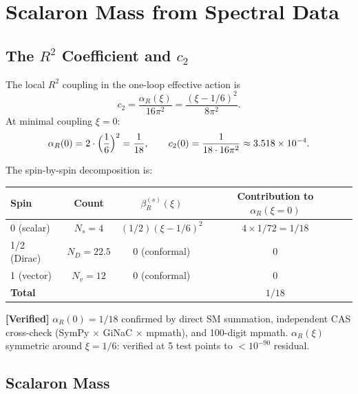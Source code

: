 \documentclass[11pt,a4paper]{article}
\theoremstyle{plain}
\theoremstyle{definition}
\newcommand{\verified}[1]{%
  \par\smallskip\noindent
  \colorbox{green!10}{\parbox{\dimexpr\linewidth-2\fboxsep}{%
    \textcolor{green!50!black}{\textbf{[Verified]}} #1}}%
  \par\smallskip}
\begin{document}
\section{Scalaron Mass from Spectral Data}\label{sec:scalaron-mass}

\subsection{The $R^2$ Coefficient and $c_2$}

The local $R^2$ coupling in the one-loop effective action is
\begin{equation}\label{eq:c2}
  c_2 = \frac{\alpha_R(\xi)}{16\pi^2}
  = \frac{(\xi - 1/6)^2}{8\pi^2}.
\end{equation}
At minimal coupling $\xi = 0$:
\begin{equation}\label{eq:c2-xi0}
  \alpha_R(0) = 2\cdot\Bigl(\frac{1}{6}\Bigr)^2 = \frac{1}{18},
  \qquad
  c_2(0) = \frac{1}{18 \cdot 16\pi^2} \approx 3.518 \times 10^{-4}.
\end{equation}

The spin-by-spin decomposition is:
\begin{center}
\begin{tabular}{lcccc}
\toprule
Spin & Count & $\beta_R^{(s)}(\xi)$ & Contribution to $\alpha_R(\xi=0)$ \\
\midrule
0 (scalar) & $N_s = 4$ & $(1/2)(\xi-1/6)^2$ & $4 \times 1/72 = 1/18$ \\
1/2 (Dirac) & $N_D = 22.5$ & 0 (conformal) & 0 \\
1 (vector) & $N_v = 12$ & 0 (conformal) & 0 \\
\midrule
\textbf{Total} & & & $1/18$ \\
\bottomrule
\end{tabular}
\end{center}

\verified{$\alpha_R(0) = 1/18$ confirmed by direct SM summation, independent CAS
cross-check (SymPy $\times$ GiNaC $\times$ mpmath), and 100-digit mpmath.
$\alpha_R(\xi)$ symmetric around $\xi = 1/6$: verified at 5 test points
to $< 10^{-90}$ residual.}

\subsection{Scalaron Mass}\label{sec:scalaron-mass-formula}
\end{document}
